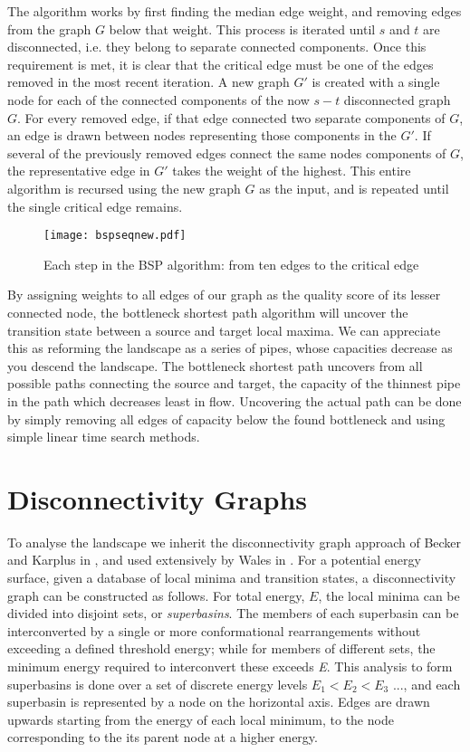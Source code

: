 The algorithm works by first finding the median edge weight, and removing edges from the graph $G$ below that weight.  This process is iterated until $s$ and $t$ are disconnected, i.e. they belong to separate connected components.  Once this requirement is met, it is clear that the critical edge must be one of the edges removed in the most recent iteration.  A new graph $G'$ is created with a single node for each of the connected components of the now $s-t$ disconnected graph $G$.  For every removed edge, if that edge connected two separate components of $G$, an edge is drawn between nodes representing those components in the $G'$.  If several of the previously removed edges connect the same nodes components of $G$, the representative edge in $G'$ takes the weight of the highest.  This entire algorithm is recursed using the new graph $G$ as the input, and  is repeated until the single critical edge remains.

\begin{figure}[h]
  \centering
  \texttt{[image: bspseqnew.pdf]}
  \caption{Each step in the BSP algorithm: from ten edges to the critical edge}
\end{figure}

By assigning weights to all edges of our graph as the quality score of its lesser connected node, the bottleneck shortest path algorithm will uncover the transition state between a source and target local maxima.  We can appreciate this as reforming the landscape as a series of pipes, whose capacities decrease as you descend the landscape.  The bottleneck shortest path uncovers from all possible paths connecting the source and target, the capacity of the thinnest pipe in the path which decreases least in flow.  Uncovering the actual path can be done by simply removing all edges of capacity below the found bottleneck and using simple linear time search methods.
\clearpage
\section{Disconnectivity Graphs}
\label{sec:dgGraphs}

To analyse the landscape we inherit the disconnectivity graph approach of Becker and Karplus in \cite{OMBecker1997}, and used extensively by Wales in \cite{Wales2005}.  For a potential energy surface, given a database of local minima and transition states, a disconnectivity graph can be constructed as follows. For total energy, $E$, the local minima can be divided into disjoint sets, or \textit{superbasins}. The members of each superbasin can be interconverted by a single or more conformational rearrangements without exceeding a defined threshold energy; while for members of different sets, the minimum energy required to interconvert these exceeds \textit{E}. This analysis to form superbasins is done over a set of discrete energy levels $E_1 < E_2 < E_3$ ..., and each superbasin is represented by a node on the horizontal axis. Edges are drawn upwards starting from the energy of each local minimum, to the node corresponding to the its parent node at a higher energy.

